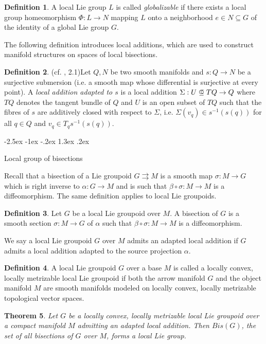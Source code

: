 \documentclass[12pt,a4paper]{amsart}
\makeatletter
\def\section{\@startsection{section}{1}{\z@}%
  {-2.5ex \@plus -1ex \@minus -.2ex}%
  {1.3ex \@plus.2ex}%
  {\normalfont\large\bfseries\raggedright}}
\theoremstyle{plain}
\newtheorem{theorem}{Theorem}[section]
\theoremstyle{definition}
\newtheorem{definition}[theorem]{Definition}
\newcommand\opn{\mathrel{\ooalign{$\subseteq$\cr
  \hidewidth\raise.225ex\hbox{$\circ\mkern.5mu$}\cr}}}
\makeatother
\begin{document}
\begin{definition}
A local Lie group $L$ is called \emph{globalizable} if there exists a local group homeomorphism
$\Phi:L\to N$
mapping $L$ onto a neighborhood
$e\in N\subseteq G$
of the identity of a global Lie group $G$.
\end{definition}


The following definition introduces local additions, which are used to construct manifold structures on spaces of local bisections.
\begin{definition} (cf. \cite{Schmeding}, 2.1)Let $Q,N$ be two smooth manifolds and $s \colon Q \to N$ be a surjective submersion (i.e. a smooth map whose differential is surjective at every point). A \emph{local addition adapted to $s$} is a local addition $\Sigma: U\opn TQ \rightarrow Q$ where $TQ$ denotes the tangent bundle of $Q$ and $U$ is an open subset of $TQ$
such that the fibres of $s$ are additively closed with respect to $\Sigma$, i.e.
$\Sigma(v_q) \in s^{-1}(s(q))$  for all $q \in Q$ and $v_q \in T_qs^{-1}(s(q)) $.
\end{definition} 

\section{Local group of bisections}


Recall that a bisection of a Lie groupoid $G\rightrightarrows M$ is a smooth map $\sigma: M \rightarrow G$ which is right inverse to $\alpha: G \rightarrow M$ and is such that $\beta \circ \sigma :M \rightarrow M$ is a diffeomorphism. The same definition applies to local Lie groupoids.

\begin{definition}
Let $G$ be a local Lie groupoid over $M$. 
A bisection of $G$ is a smooth section 
$\sigma : M \to G$ of $\alpha$ such that 
$\beta \circ \sigma : M \to M$ is a diffeomorphism.
\end{definition}
We say a local Lie groupoid $G$ over $M$ admits an adapted local addition if $G$ admits a local addition adapted to the source projection $\alpha$.
\begin{definition}
A local Lie groupoid $G$ over a base $M$ is called a locally convex, locally metrizable local Lie groupoid if both the arrow manifold $G$ and the object manifold $M$ are smooth manifolds modeled on locally convex, locally metrizable topological vector spaces.
\end{definition}
\begin{theorem}\label{theo1}
   Let $G$ be a locally convex, locally metrizable local Lie groupoid over a compact manifold $M$ admitting an adapted local addition. Then $Bis(G)$, the set of all bisections of $G$ over $M$, forms a local Lie group.
  \end{theorem}
\end{document}
